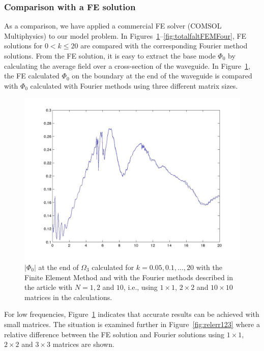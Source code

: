 \documentclass[numreferences]{kluwer}
\providecommand{\abs}[1]{\left\lvert#1\right\rvert}
\renewcommand{\Phi}{\varPhi}
\renewcommand{\Phi}{\varPhi}
\begin{document}
\subsubsection{Comparison with a FE solution}
\label{sec:FEMvsFourier}

As a comparison, we have applied a commercial FE solver (COMSOL
Multiphysics) to our model problem. In
Figures~\ref{fig:FEMvsFourier}--\ref{fig:totalfaltFEMFour}, FE
solutions for $0<k\le20$ are compared with the corresponding Fourier
method solutions. From the FE solution, it is easy to extract the base
mode $\Phi_0$ by calculating the average field over a cross-section of
the waveguide. In Figure~\ref{fig:FEMvsFourier}, the FE calculated
$\Phi_0$ on the boundary at the end of the waveguide is compared with
$\Phi_0$ calculated with Fourier methods using three different matrix
sizes.
\begin{figure}[htb]
  \centering
  \includegraphics[width=0.9\linewidth]{FEMvsFourier}
  \caption{$\abs{\Phi_{0}}$ at the end of $\Omega_3$ calculated for
    $k=0.05,0.1,\dots,20$ with the Finite Element Method and with the
    Fourier methods described in the article with $N=1,2$ and $10$,
    i.e., using $1\times1$, $2\times2$ and $10\times10$ matrices in
    the calculations.}
  \label{fig:FEMvsFourier}
\end{figure}

For low frequencies, Figure~\ref{fig:FEMvsFourier} indicates that
accurate results can be achieved with small matrices. The situation is
examined further in Figure~\ref{fig:relerr123} where a relative
difference between the FE solution and Fourier solutions using
$1\times1$, $2\times2$ and $3\times3$ matrices are shown.
\end{document}
